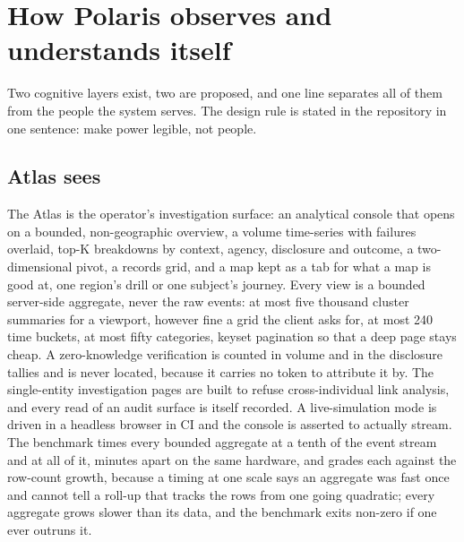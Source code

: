 \section{How Polaris observes and understands itself}
\label{sec:cognition}



Two cognitive layers exist, two are proposed, and one line separates all of them from the people
the system serves. The design rule is stated in the repository in one sentence: make power legible,
not people.


\subsection{Atlas sees}

The Atlas is the operator's investigation surface: an analytical console that opens on a bounded,
non-geographic overview, a volume time-series with failures overlaid, top-K breakdowns by context,
agency, disclosure and outcome, a two-dimensional pivot, a records grid, and a map kept as a tab for
what a map is good at, one region's drill or one subject's journey. Every view is a bounded
server-side aggregate, never the raw events: at most five thousand cluster summaries for a viewport, however fine a grid the client asks for,
at most 240 time buckets, at most fifty categories, keyset pagination so that a deep page stays
cheap. A zero-knowledge verification is counted in volume and in the disclosure tallies and is never
located, because it carries no token to attribute it by. The single-entity investigation pages are
built to refuse cross-individual link analysis, and every read of an audit surface is itself
recorded. A live-simulation mode is driven in a headless browser in CI and the console is asserted to
actually stream. The benchmark times every bounded aggregate at a tenth of the
event stream and at all of it, minutes apart on the same hardware, and grades each against the
row-count growth, because a timing at one scale says an aggregate was fast once and cannot tell a
roll-up that tracks the rows from one going quadratic; every aggregate grows slower than its data,
and the benchmark exits non-zero if one ever outruns it. \sImpl

